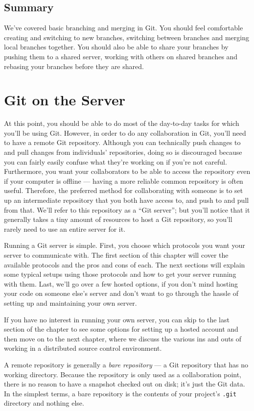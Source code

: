 \documentclass[a4paper]{book}
\newcounter{tab}[chapter]
\newcommand{\chap}[1]{\newpage\thispagestyle{empty}\chapter{#1}\label{chap:\thechapter}}
\begin{document}
\section{Summary}

We've covered basic branching and merging in Git. You should feel comfortable creating and switching to new branches, switching between branches and merging local branches together. You should also be able to share your branches by pushing them to a shared server, working with others on shared branches and rebasing your branches before they are shared.

\chap{Git on the Server}

At this point, you should be able to do most of the day-to-day tasks for which you'll be using Git. However, in order to do any collaboration in Git, you'll need to have a remote Git repository. Although you can technically push changes to and pull changes from individuals' repositories, doing so is discouraged because you can fairly easily confuse what they're working on if you're not careful. Furthermore, you want your collaborators to be able to access the repository even if your computer is offline --- having a more reliable common repository is often useful. Therefore, the preferred method for collaborating with someone is to set up an intermediate repository that you both have access to, and push to and pull from that. We'll refer to this repository as a “Git server”; but you'll notice that it generally takes a tiny amount of resources to host a Git repository, so you'll rarely need to use an entire server for it.

Running a Git server is simple. First, you choose which protocols you want your server to communicate with. The first section of this chapter will cover the available protocols and the pros and cons of each. The next sections will explain some typical setups using those protocols and how to get your server running with them. Last, we'll go over a few hosted options, if you don't mind hosting your code on someone else's server and don't want to go through the hassle of setting up and maintaining your own server.

If you have no interest in running your own server, you can skip to the last section of the chapter to see some options for setting up a hosted account and then move on to the next chapter, where we discuss the various ins and outs of working in a distributed source control environment.

A remote repository is generally a \emph{bare repository} --- a Git repository that has no working directory. Because the repository is only used as a collaboration point, there is no reason to have a snapshot checked out on disk; it's just the Git data. In the simplest terms, a bare repository is the contents of your project's \texttt{.git} directory and nothing else.
\end{document}

